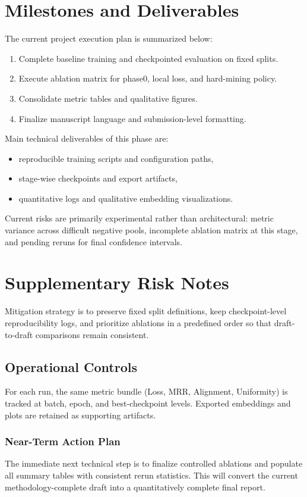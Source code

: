 \documentclass[unnumsec,webpdf,contemporary,large]{oup-authoring-template}%
\theoremstyle{thmstyleone}%
\theoremstyle{thmstyletwo}%
\theoremstyle{thmstylethree}%
\begin{document}
\section{Milestones and Deliverables}\label{sec9}

The current project execution plan is summarized below:
\begin{enumerate}[1.]
\item Complete baseline training and checkpointed evaluation on fixed splits.
\item Execute ablation matrix for phase0, local loss, and hard-mining policy.
\item Consolidate metric tables and qualitative figures.
\item Finalize manuscript language and submission-level formatting.
\end{enumerate}

Main technical deliverables of this phase are:
\begin{itemize}
\item reproducible training scripts and configuration paths,
\item stage-wise checkpoints and export artifacts,
\item quantitative logs and qualitative embedding visualizations.
\end{itemize}

\begin{boxtext}
Current risks are primarily experimental rather than architectural: metric variance across difficult negative pools, incomplete ablation matrix at this stage, and pending reruns for final confidence intervals.

\section{Supplementary Risk Notes}
Mitigation strategy is to preserve fixed split definitions, keep checkpoint-level reproducibility logs, and prioritize ablations in a predefined order so that draft-to-draft comparisons remain consistent.

\subsection{Operational Controls}
For each run, the same metric bundle (Loss, MRR, Alignment, Uniformity) is tracked at batch, epoch, and best-checkpoint levels. Exported embeddings and plots are retained as supporting artifacts.

\subsubsection{Near-Term Action Plan} 
The immediate next technical step is to finalize controlled ablations and populate all summary tables with consistent rerun statistics. This will convert the current methodology-complete draft into a quantitatively complete final report.
\end{boxtext}
\end{document}
